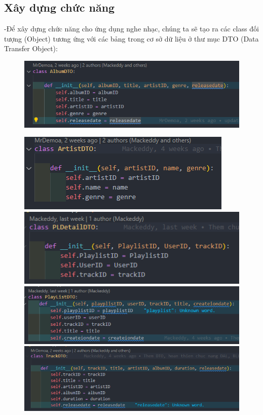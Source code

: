 \documentclass[a4paper]{article}
\begin{document}
\subsection{Xây dựng chức năng}
\begin{flushleft}
	-Để xây dựng chức năng cho ứng dụng nghe nhạc, chúng ta sẽ tạo ra các class đối tượng (Object) tương ứng với các bảng trong cơ sở dữ liệu ở thư mục DTO (Data Transfer Object):
	\begin{figure}[h]
		\centering
		\includegraphics[width=\textwidth]{AlbumDTO.png}
	\end{figure}
\end{flushleft}
\begin{flushleft}
	\begin{figure}[h]
		\includegraphics[width=\textwidth]{ArtistDTO.png}
		\includegraphics[width=\textwidth]{PlayListDetailDTO.png}
		\includegraphics[width=\textwidth]{PlayListDTO.png}
		\includegraphics[width=\textwidth]{TrackDTO.png}
	\end{figure}
\end{flushleft}
\clearpage
\end{document}
